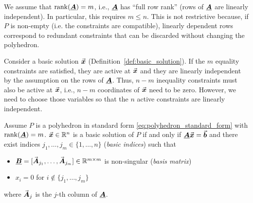 We assume that \(\operatorname{rank}(\underline{\boldsymbol{A}}) = m\), i.e., \(\underline{\boldsymbol{A}}\) has ``full row rank'' (rows of \(\underline{\boldsymbol{A}}\) are linearly independent).
In particular, this requires \(m \leq n\).
This is not restrictive because, if \(P\) is non-empty (i.e. the constraints are compatible), linearly dependent rows correspond to redundant constraints that can be discarded without changing the polyhedron.

Consider a basic solution \(\vec{\boldsymbol{x}}\) (Definition~\ref{def:basic_solution}).
If the \(m\) equality constraints are satisfied, they are active at \(\vec{\boldsymbol{x}}\) and they are linearly independent by the assumption on the rows of \(\underline{\boldsymbol{A}}\).
Thus, \(n - m\) inequality constraints must also be active at \(\vec{\boldsymbol{x}}\), i.e., \(n - m\) coordinates of \(\vec{\boldsymbol{x}}\) need to be zero. 
However, we need to choose those variables so that the \(n\) active constraints are linearly independent.

\begin{theorem}\label{thm:basic_solutions_standard_form}
Assume \(P\) is a polyhedron in standard form \eqref{eq:polyhedron_standard_form} with \(\operatorname{rank}(\underline{\boldsymbol{A}}) = m\).
\(\vec{\boldsymbol{x}} \in \mathbb{R}^n\) is a basic solution of \(P\) if and only if \(\underline{\boldsymbol{A}} \vec{\boldsymbol{x}} = \vec{\boldsymbol{b}}\) and there exist indices \(j_1, \ldots, j_m \in \{1, \ldots, n\}\) (\emph{basic indices}) such that
\begin{itemize}
\item \(\underline{\boldsymbol{B}} = [\vec{\boldsymbol{A}}_{j_1}, \ldots, \vec{\boldsymbol{A}}_{j_m}] \in \mathbb{R}^{m\times m}\) is non-singular (\emph{basis matrix})
\item \(x_i = 0\) for \(i \notin \{j_1, \ldots, j_m\}\)
\end{itemize}
where \(\vec{\boldsymbol{A}}_j\) is the \(j\)-th column of \(\underline{\boldsymbol{A}}\).
\end{theorem}

